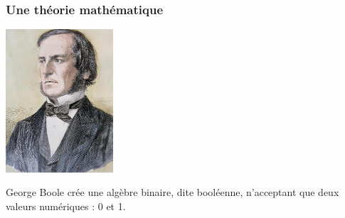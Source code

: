 \documentclass[svgnames,11pt]{beamer}
\begin{document}
\begin{frame}
    \frametitle{Une théorie mathématique}
    \begin{center}
        \centering
        \includegraphics[width=4cm]{ressources/boole.jpg}
    \end{center}
    \begin{aretenir}[1844-1854]
        George Boole crée une algèbre binaire, dite booléenne, n'acceptant que deux valeurs numériques : 0 et 1.
    \end{aretenir}
\end{frame}
\end{document}

